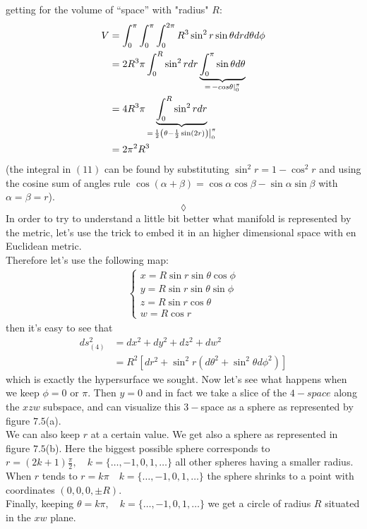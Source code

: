 getting for the volume of ``space''  with "radius" $R$:
\begin{align}
V&= \int_{0}^{\pi}\int_{0}^{\pi}\int_{0}^{2\pi}R^3\sin^2 r\sin\theta dr d\theta d\phi\\
&= 2 R^3\pi  \int_{0}^{R}\sin^2 r dr \underbrace{\int_{0}^{\pi}\sin\theta d\theta}_{=\left. -cos\theta\right|_0^{\pi}}\\
&= 4 R^3\pi  \underbrace{\int_{0}^{R}\sin^2 r dr}_{=\left.\frac{1}{2}\left(\theta-\frac{1}{2}\sin (2 r)\right)\right|_0^{\pi}}\\
&=2\pi^2 R^3  
\end{align}
(the integral in $(11)$ can be found by substituting $\sin^2 r = 1-\cos^2 r$ and  using the cosine sum of angles rule $\cos\left(\alpha+\beta\right) = \cos\alpha\cos\beta-\sin\alpha\sin\beta$ with $\alpha = \beta=r$).
$$\lozenge$$
In order to try to understand a little bit better what manifold is represented by the metric, let's use the trick to embed it in an higher dimensional space with en Euclidean metric.\\
Therefore let's use the following map:
\begin{align}
\left\{\begin{array}{l}
x=R\sin r\sin\theta\cos\phi\\
y=R\sin r\sin\theta\sin\phi\\
z=R\sin r\cos\theta\\
w=R\cos r
\end{array}\right.
\end{align}
then it's easy to see that
\begin{align}
ds_{(4)}^2 &=  dx^2+dy^2+dz^2+dw^2\\
&= R^2\left[dr^2+\sin^2 r\left(d\theta^2+\sin^2\theta d\phi^2\right)\right]
\end{align}
which is exactly the hypersurface we sought.
Now let's see what happens when we keep $\phi= 0 \text{ or } \pi$. Then $y=0$ and in fact we take a slice of the $4-space$ along the $xzw$ subspace, and can visualize this $3-$space as a sphere as represented by figure $7.5$(a). \\
We can also keep $r$ at a certain value. We get also a sphere as represented in figure $7.5$(b). Here the biggest possible sphere corresponds to $r=(2k+1)\frac{\pi}{2},\quad k=\{\dots,-1,0,1, \dots\}$ all other spheres having a smaller radius. When $r$ tends to $r=k\pi\quad k=\{\dots,-1,0,1, \dots\}$ the sphere shrinks to a point with coordinates $(0,0,0,\pm R)$.\\
Finally, keeping $\theta =k\pi,\quad k=\{\dots,-1,0,1, \dots\}$ we get a circle of radius $R$ situated in the $xw$ plane.

